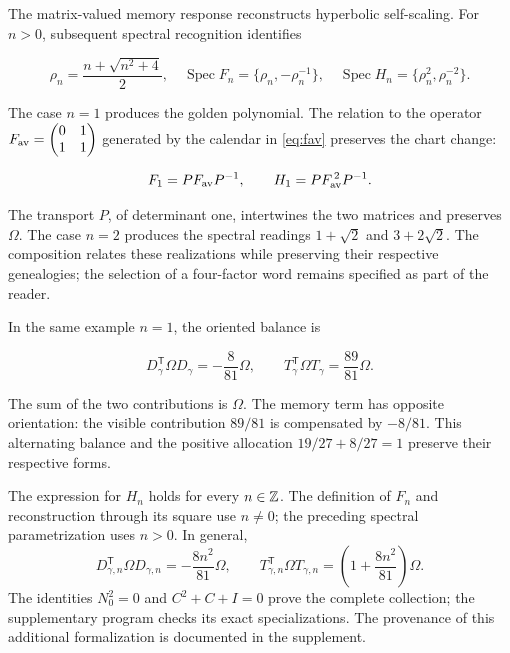 The matrix-valued memory response reconstructs hyperbolic self-scaling. For \(n>0\), subsequent spectral recognition identifies

\begin{equation}
\rho_n=\frac{n+\sqrt{n^2+4}}2,\quad
\operatorname{Spec}F_n=\{\rho_n,-\rho_n^{-1}\},\quad
\operatorname{Spec}H_n=\{\rho_n^2,\rho_n^{-2}\}.
\label{nuc11:eq:31}
\end{equation}

The case \(n=1\) produces the golden polynomial. The relation to the operator \(F_{\rm av}=\begin{pmatrix}0&1\\1&1\end{pmatrix}\) generated by the calendar in \eqref{eq:fav} preserves the chart change:

\begin{equation}
F_1=PF_{\rm av}P^{-1},\qquad
H_1=PF_{\rm av}^{\,2}P^{-1}.
\label{nuc11:eq:32}
\end{equation}

The transport \(P\), of determinant one, intertwines the two matrices and preserves \(\Omega\). The case \(n=2\) produces the spectral readings \(1+\sqrt2\) and \(3+2\sqrt2\). The composition relates these realizations while preserving their respective genealogies; the selection of a four-factor word remains specified as part of the reader.

In the same example \(n=1\), the oriented balance is

\begin{equation}
D_\gamma^{\mathsf T}\Omega D_\gamma=-\frac8{81}\Omega,
\qquad
T_\gamma^{\mathsf T}\Omega T_\gamma=\frac{89}{81}\Omega.
\label{nuc11:eq:33}
\end{equation}

The sum of the two contributions is \(\Omega\). The memory term has opposite orientation: the visible contribution \(89/81\) is compensated by \(-8/81\). This alternating balance and the positive allocation \(19/27+8/27=1\) preserve their respective forms.

The expression for \(H_n\) holds for every \(n\in\mathbb Z\). The definition of \(F_n\) and reconstruction through its square use \(n\ne0\); the preceding spectral parametrization uses \(n>0\). In general,
\[
 D_{\gamma,n}^{\mathsf T}\Omega D_{\gamma,n}
 =-\frac{8n^2}{81}\Omega,\qquad
 T_{\gamma,n}^{\mathsf T}\Omega T_{\gamma,n}
 =\left(1+\frac{8n^2}{81}\right)\Omega.
\]
The identities \(N_0^2=0\) and \(C^2+C+I=0\) prove the complete collection; the supplementary program checks its exact specializations. The provenance of this additional formalization is documented in the supplement.

